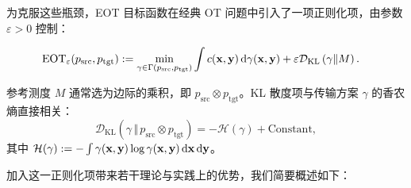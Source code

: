 为克服这些瓶颈，EOT 目标函数在经典 OT 问题中引入了一项正则化项，由参数 $\varepsilon > 0$ 控制：
\begin{mdframed}
    \begin{align}\label{eq:eot-epsilon}
\begin{aligned}
        \text{EOT}_\varepsilon(p_{\mathrm{src}}, p_{\mathrm{tgt}}) &:= \min_{\gamma \in \Gamma(p_{\mathrm{src}}, p_{\mathrm{tgt}})} \int c({\mathbf{x}},  {\mathbf{y}})  \mathop{}\!\mathrm{d}\gamma({\mathbf{x}}, {\mathbf{y}}) 
        + \varepsilon \mathcal{D}_{\text{KL}}\left(\gamma \Vert M \right).
\end{aligned}
\end{align}
\end{mdframed}
参考测度 $M$ 通常选为边际的乘积，即 $p_{\mathrm{src}} \otimes p_{\mathrm{tgt}}$。KL 散度项与传输方案 $\gamma$ 的香农熵直接相关：
\[
\mathcal{D}_{\text{KL}}(\gamma \,\Vert\, p_{\mathrm{src}} \otimes p_{\mathrm{tgt}}) = -\mathcal{H}(\gamma) + \text{Constant},
\]
其中 $\mathcal{H}(\gamma) := -\int \gamma({\mathbf{x}}, {\mathbf{y}}) \log \gamma({\mathbf{x}}, {\mathbf{y}}) \mathop{}\!\mathrm{d} {\mathbf{x}} \mathop{}\!\mathrm{d} {\mathbf{y}}$。



加入这一正则化项带来若干理论与实践上的优势，我们简要概述如下：
